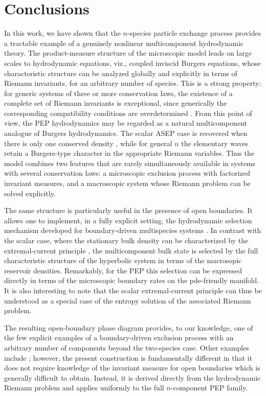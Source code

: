 \documentclass[12pt]{article}
\begin{document}
\section{Conclusions}
\label{sec:conclusion}
In this work, we have shown that the $n$-species particle exchange process
provides a tractable example of a genuinely nonlinear multicomponent
hydrodynamic theory. The product-measure structure of the microscopic
model leads on large scales to hydrodynamic equations, viz., coupled inviscid Burgers equations, whose characteristic structure
can be analyzed globally and explicitly in terms of Riemann invariants, for an arbitrary number of species. This is a
strong property: for generic systems of three or more conservation laws,
the existence of a complete set of Riemann invariants is exceptional, since
generically the corresponding compatibility conditions are overdetermined
\cite{Lax73,Lax00,Serr00,Serre}.
From this point of view, the PEP hydrodynamics may be regarded as a
natural multicomponent analogue of Burgers hydrodynamics. The scalar ASEP
case is recovered when there is only one conserved density
\cite{Gart88,Kipn99}, while for general $n$ the elementary waves retain a
Burgers-type character in the appropriate Riemann variables. Thus the
model combines two features that are rarely simultaneously available in
systems with several conservation laws: a microscopic exclusion process
with factorized invariant measures, and a macroscopic system whose Riemann
problem can be solved explicitly.

The same structure is particularly useful in the presence of open
boundaries. It allows one to implement, in a fully explicit setting, the
hydrodynamic selection mechanism developed for boundary-driven
multispecies systems \cite{Popk04,Cant24,zahra2025hydrodynamics}. In
contrast with the scalar case, where the stationary bulk density can
be characterized by the extremal-current principle
\cite{Popk99}, the multicomponent bulk state is selected by the
full characteristic structure of the hyperbolic system
 in terms of the macrosopic reservoir densities. Remarkably, for the PEP this
selection can be expressed directly
in terms of the microscopic boundary rates on the
pde-friendly manifold. It is also interesting to note that the scalar
extremal-current principle can thus be understood as a special case of the 
entropy solution
 of the associated Riemann problem. 

The resulting open-boundary phase diagram provides, to our knowledge, one
of the few explicit examples of a boundary-driven exclusion process with
an arbitrary number of components beyond the two-species case. Other
examples include \cite{Ayye17,Roy21}; however, the present construction
is fundamentally different in that it does not require knowledge of the invariant measure
for open boundaries which is generally difficult to obtain. Instead, it is 
derived directly from the hydrodynamic Riemann
problem and applies uniformly to the full $n$-component PEP family.
\end{document}
